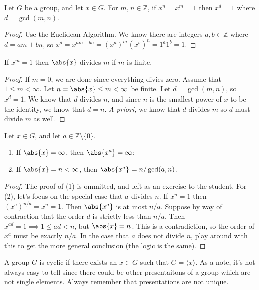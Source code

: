 \begin{proposition}
Let $G$ be a group, and let $x \in G$. For $m,n \in \mathbb{Z}$, if $x^n = x^m = 1$ then $x^d = 1$ where $d = \gcd(m,n)$.
\end{proposition}
\begin{proof}
Use the Euclidean Algorithm. We know there are integers $a,b \in \mathbb{Z}$ where $d = am + bn$, so $x^d = x^{am+bn} = (x^a)^m (x^b)^n = 1^a1^b = 1$.
\end{proof}
\begin{corollary}
If $x^m = 1$ then $\abs{x}$ divides $m$ if $m$ is finite.
\end{corollary}
\begin{proof}
If $m = 0$, we are done since everything divies zero. Assume that $1 \leq m < \infty$. Let $n = \abs{x} \leq m < \infty$ be finite. Let $d = \gcd(m,n)$, so $x^d = 1$. We know that $d$ divides $n$, and since $n$ is the smallest power of $x$ to be the identity, we know that $d = n$. \emph{A priori,} we know that $d$ divides $m$ so $d$ must divide $m$ as well.
\end{proof}
\begin{proposition}
Let $x \in G$, and let $a \in \mathbb{Z} \setminus \{0\}$.
\begin{enumerate}
\item If $\abs{x} = \infty$, then $\abs{x^a} = \infty$;
\item If $\abs{x} = n < \infty$, then $\abs{x^a} = n / \gcd(a,n)$.
\end{enumerate}
\end{proposition}
\begin{proof}
The proof of (1) is ommitted, and left as an exercise to the student. For (2), let's focus on the special case that $a$ divides $n$. If $x^n = 1$ then $(x^a)^{n/a} = x^n = 1$. Then $\abs{x^a}$ is at most $n/a$. Suppose by way of contraction that the order $d$ is strictly less than $n / a$. Then $x^{ad} = 1 \implies 1 \leq ad < n$, but $\abs{x} = n$. This is a contradiction, so the order of $x^a$ must be exactly $n/a$. In the case that $a$ does not divide $n$, play around with this to get the more general conclusion (the logic is the same).
\end{proof}

\begin{definition}
A group $G$ is cyclic if there exists an $x \in G$ such that $G = \langle x \rangle$. As a note, it's not always easy to tell since there could be other presentaitons of a group which are not single elements. Always remember that presentations are not unique.
\end{definition}

